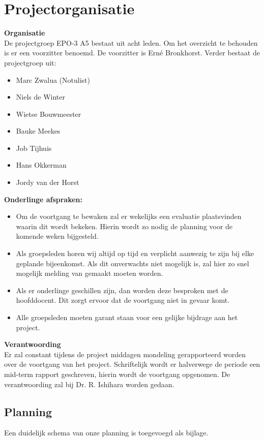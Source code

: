 \documentclass[oneside,dutch]{tudelft-report}
\begin{document}
\section{Projectorganisatie}
\textbf{Organisatie}\\
De projectgroep EPO-3 A5 bestaat uit acht leden. Om het overzicht te behouden is er een voorzitter benoemd. De voorzitter is Ern\'e Bronkhorst.
Verder bestaat de projectgroep uit:
\begin{itemize}
\item Marc Zwalua (Notulist)
\item Niels de Winter
\item Wietse Bouwmeester
\item Bauke Meekes
\item Job Tijhuis
\item Hans Okkerman
\item Jordy van der Horst
\end{itemize}
\textbf{Onderlinge afspraken:}
\begin{itemize}
\item Om de voortgang te bewaken zal er wekelijks een evaluatie plaatsvinden waarin dit wordt bekeken. Hierin wordt zo nodig de planning voor de komende weken bijgesteld.
\item Als groepsleden horen wij altijd op tijd en verplicht aanwezig te zijn bij elke geplande bijeenkomst. Als dit onverwachts niet mogelijk is, zal hier zo snel mogelijk melding van gemaakt moeten worden. 
\item Als er onderlinge geschillen zijn, dan worden deze besproken met de hoofddocent. Dit zorgt ervoor dat de voortgang niet in gevaar komt.
\item Alle groepsleden moeten garant staan voor een gelijke bijdrage aan het project.
\end{itemize}
\textbf{Verantwoording}\\
Er zal constant tijdens de project middagen mondeling gerapporteerd worden over de voortgang van het project. Schriftelijk wordt er halverwege de periode een mid-term rapport geschreven, hierin wordt de voortgang opgenomen. De verantwoording zal bij Dr. R. Ishihara worden gedaan. 

\subsection{Planning}
Een duidelijk schema van onze planning is toegevoegd als bijlage.
\end{document}
